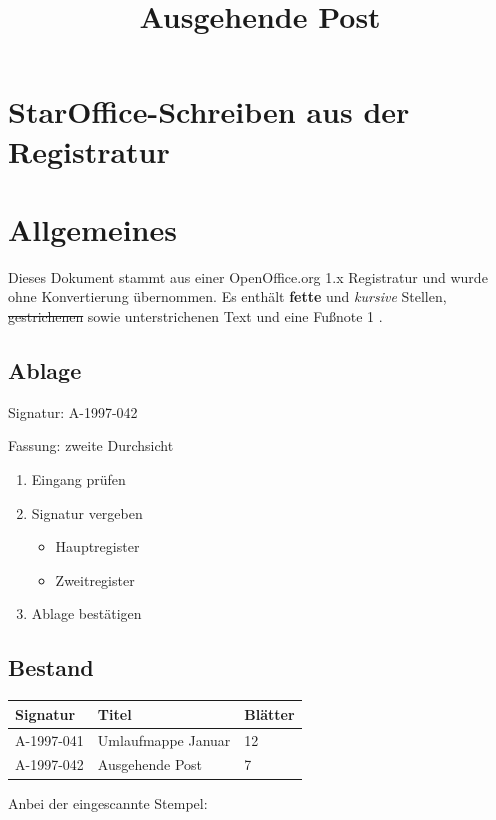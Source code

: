 \documentclass[11pt,a4paper]{article}
\title{Ausgehende Post}
\begin{document}
\maketitle

\section{StarOffice-Schreiben aus der Registratur}

\section{Allgemeines}

Dieses Dokument stammt aus einer OpenOffice.org 1.x Registratur und wurde ohne Konvertierung übernommen. Es enthält  \textbf{fette}  und  \textit{kursive}  Stellen,  \sout{gestrichenen}  sowie  unterstrichenen  Text und eine Fußnote 1 .

\subsection{Ablage}

Signatur:	A-1997-042

Fassung:	zweite  Durchsicht

\begin{enumerate}
\item Eingang prüfen
\item Signatur vergeben
  \begin{itemize}
\item Hauptregister
\item Zweitregister
  \end{itemize}
\item Ablage bestätigen
\end{enumerate}

\subsection{Bestand}

\begin{table}[h]
\begin{tabular}{|l|l|l|}
\hline
Signatur & Titel & Blätter \\ \hline
A-1997-041 & Umlaufmappe Januar & 12 \\ \hline
A-1997-042 & Ausgehende Post & 7 \\ \hline
\end{tabular}
\end{table}

Anbei der eingescannte Stempel:
\end{document}
